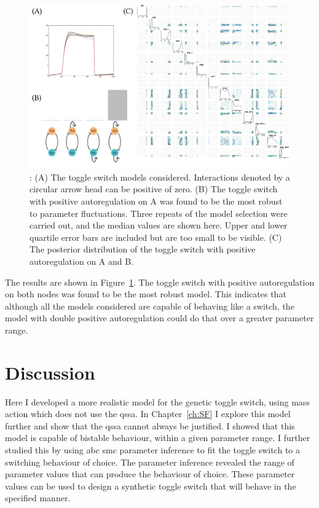 \begin{figure}[htbp]
	\centerfloat
\includegraphics[scale=0.75]{../../chapters/chapterABCSysBio/images/model_sel_res-01.png}
\caption[ABC model selection resulting posterior distribution]{\label{fig:model_sel_res}: (A) The toggle switch models considered. Interactions denoted by a circular arrow head can be positive of zero. (B) The toggle switch with positive autoregulation on A was found to be the most robust to parameter fluctuations. Three repeats of the model selection were carried out, and the median values are shown here. Upper and lower quartile error bars are included but are too small to be visible. (C) The posterior distribution of the toggle switch with positive autoregulation on A and B.}


\end{figure}
\clearpage
The results are shown in Figure~\ref{fig:model_sel_res}. The toggle switch with positive autoregulation on both nodes was found to be the most robust model. This indicates that although all the models considered are capable of behaving like a switch, the model with double positive autoregulation could do that over a greater parameter range.  



\section{Discussion}

Here I developed a more realistic model for the genetic toggle switch, using mass action which does not use the \acrshort{qssa}. In Chapter~\ref{ch:SF} I explore this model further and show that the \acrshort{qssa} cannot always be justified. I showed that this model is capable of bistable behaviour, within a given parameter range. I further studied this by using \acrshort{abc} \acrshort{smc} parameter inference to fit the toggle switch to a switching behaviour of choice. The parameter inference revealed the range of parameter values that can produce the behaviour of choice. These parameter values can be used to design a synthetic toggle switch that will behave in the specified manner. 


